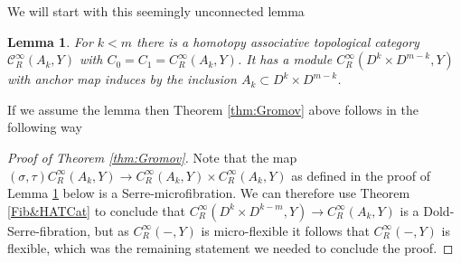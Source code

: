 \documentclass{article}
\newtheorem{lemma}[theorem]{Lemma}
\newtheorem{proposed work}[theorem]{Proposed Work}
\begin{document}
We will start with this seemingly unconnected lemma
\begin{lemma}\label{lem:AnnCat}
For $k<m$ there is a homotopy associative topological category $\mathcal{C}^\infty_R(A_k,Y)$ with $C_0=C_1=C^\infty_R(A_k,Y)$. It has a module $C^\infty_R(D^k\times D^{m-k},Y)$ with anchor map induces by the inclusion $A_k\subset D^k \times D^{m-k}$.
\end{lemma}
If we assume the lemma then Theorem \ref{thm:Gromov} above follows in the following way
\begin{proof}[Proof of Theorem \ref{thm:Gromov}]
Note that the map $(\sigma,\tau) C^\infty_R(A_k,Y)\to C^\infty_R(A_k,Y)\times C^\infty_R(A_k,Y)$ as defined in the proof of Lemma \ref{lem:AnnCat} below is a Serre-microfibration. We can therefore use Theorem \ref{Fib&HATCat} to conclude that $C^\infty_R(D^k\times D^{k-m},Y)\to C^\infty_R(A_k,Y)$ is a Dold-Serre-fibration, but as $C^\infty_R(-,Y)$ is micro-flexible it follows that $C^\infty_R(-,Y)$ is flexible, which was the remaining statement we needed to conclude the proof.
\end{proof}
\end{document}
